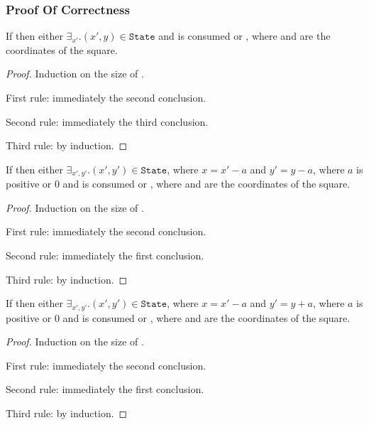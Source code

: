 \subsubsection{Proof Of Correctness}

\begin{lemma}

If  then either $\exists_{x'}. {(x',
y) \in \mathtt{State}}$ and  is consumed or
, where
 and  are the coordinates of the square.

\end{lemma}
\begin{proof}
Induction on the size of .

First rule: immediately the second conclusion.

Second rule: immediately the third conclusion.

Third rule: by induction.
\end{proof}

\begin{lemma}
If  then either $\exists_{x', y'}. {(x', y') \in \mathtt{State}}$, where $x = x' - a$ and $y' = y - a$, where $a$ is positive or $0$ and  is consumed or , where  and  are the coordinates of the square.
\end{lemma}
\begin{proof}
Induction on the size of .

First rule: immediately the second conclusion.

Second rule: immediately the first conclusion.

Third rule: by induction.
\end{proof}

\begin{lemma}
If  then either $\exists_{x', y'}. {(x', y') \in \mathtt{State}}$, where $x = x' - a$ and $y' = y + a$, where $a$ is positive or $0$ and  is consumed or , where  and  are the coordinates of the square.
\end{lemma}
\begin{proof}
Induction on the size of .

First rule: immediately the second conclusion.

Second rule: immediately the first conclusion.

Third rule: by induction.
\end{proof}

